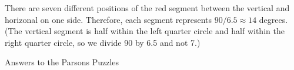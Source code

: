 \documentclass[11pt,a4paper,english]{article}
\begin{document}
There are seven different positions of the red segment between the
vertical and horizonal on one side. Therefore, each segment represents
$90 / 6.5 \approx 14$ degrees. (The vertical segment is half within the
left quarter circle and half within the right quarter circle, so we
divide 90 by 6.5 and not 7.)

\newpage

\newcommand*{\eblock}{\framebox[40pt]{\rule[-11pt]{0pt}{32pt}}\ }
\newcommand*{\eblockbig}{\framebox[58pt]{\rule[-5pt]{0pt}{20pt}}\ }
\newcommand*{\eblocksm}{\framebox[30pt]{\rule[-5pt]{0pt}{20pt}}\ }

\begin{center}
\begin{Large}
\begin{bfseries}
Answers to the Parsons Puzzles
\end{bfseries}
\end{Large}
\end{center}
\end{document}
